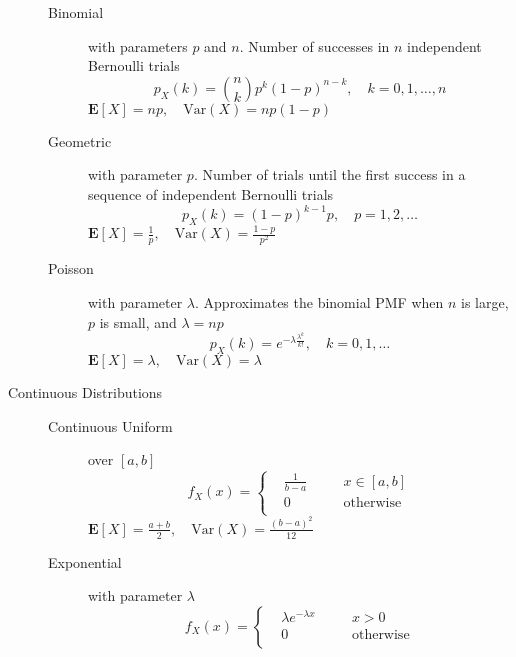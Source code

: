 \documentclass[8pt]{article}
\begin{document}
\begin{multicols}{2}
\begin{description}
\begin{description}
    \item[Binomial] with parameters $p$ and $n$. Number of successes
      in $n$ independent Bernoulli trials
      \begin{equation*}
        p_X(k) = {n \choose k}p^k(1-p)^{n-k},\quad k=0,1,\ldots,n
      \end{equation*}
      $\mathbf{E}[X]=np,\quad\text{Var}(X)=np(1-p)$
    \item[Geometric] with parameter $p$. Number of trials until the
      first success in a sequence of independent Bernoulli trials
      \begin{equation*}
        p_X(k) = (1-p)^{k-1}p,\quad p=1,2,\ldots
      \end{equation*}
      $\mathbf{E}[X]=\frac{1}{p},\quad\text{Var}(X)=\frac{1-p}{p^2}$
    \item[Poisson] with parameter $\lambda$. Approximates the binomial
      PMF when $n$ is large, $p$ is small, and $\lambda = np$
      \begin{equation*}
        p_X(k) = e^{-\lambda\frac{\lambda^k}{k!}},\quad k=0,1,\ldots
      \end{equation*}
      $\mathbf{E}[X]=\lambda,\quad\text{Var}(X)=\lambda$
    \end{description}
  \item[Continuous Distributions] \hfill
    \begin{description}
    \item[Continuous Uniform] over $[a,b]$
      \begin{equation*}
        f_X(x) = \left\{
          \begin{aligned}
            & \frac{1}{b-a} &&\quad x \in [a,b] \\
            & 0 &&\quad \text{otherwise} \\
          \end{aligned}
        \right.
      \end{equation*}
      $\mathbf{E}[X]=\frac{a+b}{2},\quad\text{Var}(X)=\frac{(b-a)^2}{12}$
    \item[Exponential] with parameter $\lambda$
      \begin{equation*}
        f_X(x) = \left\{
          \begin{aligned}
            & \lambda e^{-\lambda x} &&\quad x > 0 \\
            & 0 &&\quad \text{otherwise} \\
          \end{aligned}
        \right.
      \end{equation*}

\end{description}
\end{description}
\end{multicols}
\end{document}
